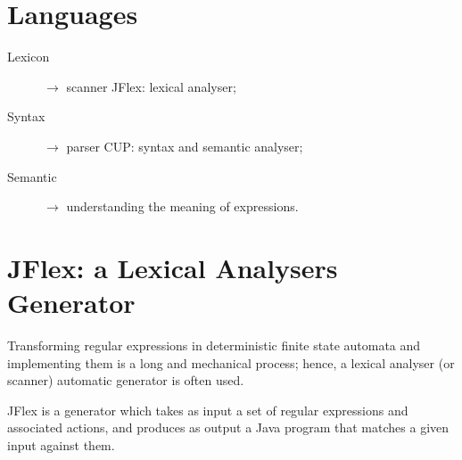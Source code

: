 \section{Languages}
\begin{description}
    \item[Lexicon] $\to$ scanner JFlex: lexical analyser;
    \item[Syntax] $\to$ parser CUP: syntax and semantic analyser;
    \item[Semantic] $\to$ understanding the meaning of expressions.
\end{description}

\section{JFlex: a Lexical Analysers Generator}
Transforming regular expressions in deterministic finite state automata and implementing them is a long and mechanical process; hence, a lexical analyser (or scanner) automatic generator is often used.

JFlex is a generator which takes as input a set of regular expressions and associated actions, and produces as output a Java program that matches a given input against them.

